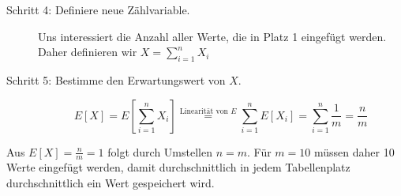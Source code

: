 \documentclass[11pt,a4paper]{article}
\begin{document}
\begin{loesung}
\begin{enumerate}
\begin{description}
            \item[Schritt 4: Definiere neue Zählvariable.]
            Uns interessiert die Anzahl aller Werte, die in Platz 1 eingefügt werden.
            Daher definieren wir $X = \sum\limits_{i = 1}^{n} X_i$
            \item[Schritt 5: Bestimme den Erwartungswert von $X$.]
            \begin{equation*}
                E[X] = E\left[ \sum\limits_{i = 1}^n X_i \right]
                \overset{\text{Linearität von $E$}}{=} \sum\limits_{i = 1}^n E[X_i]
                = \sum\limits_{i = 1}^n \frac{1}{m} = \frac{n}{m}
            \end{equation*}
        \end{description}
        Aus $E[X] = \frac{n}{m} = 1$ folgt durch Umstellen $n = m$. 
        Für $m = 10$ müssen daher 10 Werte eingefügt werden, damit durchschnittlich in jedem Tabellenplatz durchschnittlich ein Wert gespeichert wird.
    \end{enumerate}
\end{loesung}
\end{document}
